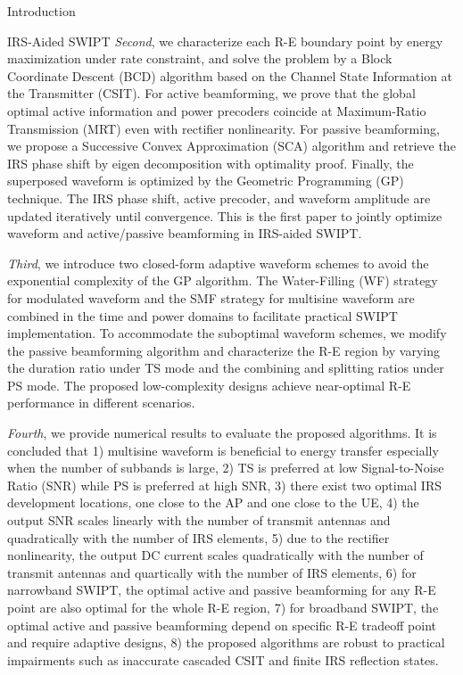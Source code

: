 \documentclass[journal]{IEEEtran}
\begin{document}
\begin{section}{Introduction}
\begin{subsection}{IRS-Aided SWIPT}
			\emph{Second}, we characterize each R-E boundary point by energy maximization under rate constraint, and solve the problem by a Block Coordinate Descent (BCD) algorithm based on the Channel State Information at the Transmitter (CSIT). For active beamforming, we prove that the global optimal active information and power precoders coincide at Maximum-Ratio Transmission (MRT) even with rectifier nonlinearity. For passive beamforming, we propose a Successive Convex Approximation (SCA) algorithm and retrieve the IRS phase shift by eigen decomposition with optimality proof. Finally, the superposed waveform is optimized by the Geometric Programming (GP) technique. The IRS phase shift, active precoder, and waveform amplitude are updated iteratively until convergence. This is the first paper to jointly optimize waveform and active/passive beamforming in IRS-aided SWIPT.

			\emph{Third}, we introduce two closed-form adaptive waveform schemes to avoid the exponential complexity of the GP algorithm. The Water-Filling (WF) strategy for modulated waveform and the SMF strategy for multisine waveform are combined in the time and power domains to facilitate practical SWIPT implementation. To accommodate the suboptimal waveform schemes, we modify the passive beamforming algorithm and characterize the R-E region by varying the duration ratio under TS mode and the combining and splitting ratios under PS mode. The proposed low-complexity designs achieve near-optimal R-E performance in different scenarios.

			\emph{Fourth}, we provide numerical results to evaluate the proposed algorithms. It is concluded that 1) multisine waveform is beneficial to energy transfer especially when the number of subbands is large, 2) TS is preferred at low Signal-to-Noise Ratio (SNR) while PS is preferred at high SNR, 3) there exist two optimal IRS development locations, one close to the AP and one close to the UE, 4) the output SNR scales linearly with the number of transmit antennas and quadratically with the number of IRS elements, 5) due to the rectifier nonlinearity, the output DC current scales quadratically with the number of transmit antennas and quartically with the number of IRS elements, 6) for narrowband SWIPT, the optimal active and passive beamforming for any R-E point are also optimal for the whole R-E region, 7) for broadband SWIPT, the optimal active and passive beamforming depend on specific R-E tradeoff point and require adaptive designs, 8) the proposed algorithms are robust to practical impairments such as inaccurate cascaded CSIT and finite IRS reflection states.


\end{subsection}
\end{section}
\end{document}
